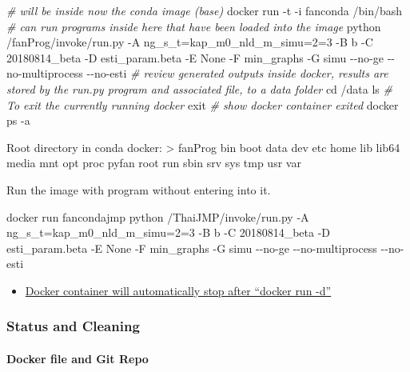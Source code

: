 \documentclass[
]{book}
\newenvironment{Shaded}{\begin{snugshade}}{\end{snugshade}}
\newcommand{\BuiltInTok}[1]{#1}
\newcommand{\CommentTok}[1]{\textcolor[rgb]{0.56,0.35,0.01}{\textit{#1}}}
\newcommand{\ExtensionTok}[1]{#1}
\newcommand{\FunctionTok}[1]{\textcolor[rgb]{0.00,0.00,0.00}{#1}}
\newcommand{\NormalTok}[1]{#1}
\providecommand{\tightlist}{%
  \setlength{\itemsep}{0pt}\setlength{\parskip}{0pt}}
\begin{document}
\begin{Shaded}
\begin{Highlighting}[]
\CommentTok{\# will be inside now the conda image (base)}
\ExtensionTok{docker}\NormalTok{ run {-}t {-}i fanconda /bin/bash}
\CommentTok{\# can run programs inside here that have been loaded into the image}
\ExtensionTok{python}\NormalTok{ /fanProg/invoke/run.py {-}A ng\_s\_t=kap\_m0\_nld\_m\_simu=2=3 {-}B b {-}C 20180814\_beta {-}D esti\_param.beta {-}E None {-}F min\_graphs {-}G simu {-}{-}no{-}ge {-}{-}no{-}multiprocess {-}{-}no{-}esti}
\CommentTok{\# review generated outputs inside docker, results are stored by the run.py program and associated file, to a data folder}
\BuiltInTok{cd}\NormalTok{ /data}
\FunctionTok{ls}
\CommentTok{\# To exit the currently running docker}
\BuiltInTok{exit}
\CommentTok{\# show docker container exited}
\ExtensionTok{docker}\NormalTok{ ps {-}a}
\end{Highlighting}
\end{Shaded}

Root directory in conda docker:
\textgreater{} fanProg bin boot data dev etc home lib lib64 media mnt opt proc pyfan root run sbin srv sys tmp usr var

Run the image with program without entering into it.

\begin{Shaded}
\begin{Highlighting}[]
\ExtensionTok{docker}\NormalTok{ run fancondajmp python /ThaiJMP/invoke/run.py {-}A ng\_s\_t=kap\_m0\_nld\_m\_simu=2=3 {-}B b {-}C 20180814\_beta {-}D esti\_param.beta {-}E None {-}F min\_graphs {-}G simu {-}{-}no{-}ge {-}{-}no{-}multiprocess {-}{-}no{-}esti}
\end{Highlighting}
\end{Shaded}

\begin{itemize}
\tightlist
\item
  \href{https://stackoverflow.com/questions/30209776/docker-container-will-automatically-stop-after-docker-run-d}{Docker container will automatically stop after ``docker run -d''}
\end{itemize}

\hypertarget{status-and-cleaning}{%
\subsubsection{Status and Cleaning}\label{status-and-cleaning}}

\hypertarget{docker-file-and-git-repo}{%
\paragraph{Docker file and Git Repo}\label{docker-file-and-git-repo}}
\end{document}
